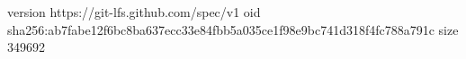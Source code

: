 version https://git-lfs.github.com/spec/v1
oid sha256:ab7fabe12f6bc8ba637ecc33e84fbb5a035ce1f98e9bc741d318f4fc788a791c
size 349692

